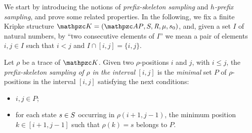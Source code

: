 We start by introducing the notions of   \emph{prefix-skeleton sampling}  and \emph{$h$-prefix sampling}, and prove some related properties.
%
In the following, we fix a finite Kripke structure $\Ku = \KuDef$, and,  given a set $I$ of natural numbers, by ``two consecutive elements of $I$'' we mean a pair of elements $i,j\in I$ such that $i<j$ and $I\cap [i,j]=\{i,j\}$.

\begin{definition}\label{def:skeleton}  Let $\rho$ be a trace of $\Ku$. Given two $\rho$-positions $i$ and $j$, with $i\leq j$, the \emph{prefix-skeleton sampling of $\rho$ in the interval} $[i,j]$ is the \emph{minimal} set $P$ of $\rho$-positions in the interval $[i,j]$ satisfying the next conditions:
\begin{itemize}
  \item $i,j\in P$;
  \item for each state $s\in S$ occurring in $\rho(i+1,j-1)$, the minimum position $k\in [i+1,j-1]$ such that $\rho(k)=s$ belongs to $P$.
\end{itemize}
\end{definition}

